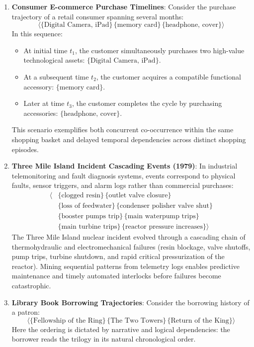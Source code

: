 \begin{enumerate}[label=\textbf{\arabic*.}]
    \item \textbf{Consumer E-commerce Purchase Timelines}:
    Consider the purchase trajectory of a retail consumer spanning several months:
    \begin{equation}
    \label{eq:seq-example-ecommerce-en}
    \langle \{\text{Digital Camera, iPad}\} \, \{\text{memory card}\} \, \{\text{headphone, cover}\} \rangle
    \end{equation}
    In this sequence:
    \begin{itemize}[noitemsep]
        \item At initial time $t_1$, the customer simultaneously purchases two high-value technological assets: $\{\text{Digital Camera, iPad}\}$.
        \item At a subsequent time $t_2$, the customer acquires a compatible functional accessory: $\{\text{memory card}\}$.
        \item Later at time $t_3$, the customer completes the cycle by purchasing accessories: $\{\text{headphone, cover}\}$.
    \end{itemize}
    This scenario exemplifies both concurrent co-occurrence within the same shopping basket and delayed temporal dependencies across distinct shopping episodes.

    \item \textbf{Three Mile Island Incident Cascading Events (1979)}:
    In industrial telemonitoring and fault diagnosis systems, events correspond to physical faults, sensor triggers, and alarm logs rather than commercial purchases:
    \begin{align}
    \label{eq:seq-example-tmi-en}
    \langle &\{\text{clogged resin}\} \, \{\text{outlet valve closure}\} \nonumber \\
    &\{\text{loss of feedwater}\} \, \{\text{condenser polisher valve shut}\} \nonumber \\
    &\{\text{booster pumps trip}\} \, \{\text{main waterpump trips}\} \nonumber \\
    &\{\text{main turbine trips}\} \, \{\text{reactor pressure increases}\} \rangle
    \end{align}
    The Three Mile Island nuclear incident evolved through a cascading chain of thermohydraulic and electromechanical failures (resin blockage, valve shutoffs, pump trips, turbine shutdown, and rapid critical pressurization of the reactor). Mining sequential patterns from telemetry logs enables predictive maintenance and timely automated interlocks before failures become catastrophic.

    \item \textbf{Library Book Borrowing Trajectories}:
    Consider the borrowing history of a patron:
    \begin{equation}
    \label{eq:seq-example-library-en}
    \langle \{\text{Fellowship of the Ring}\} \, \{\text{The Two Towers}\} \, \{\text{Return of the King}\} \rangle
    \end{equation}
    Here the ordering is dictated by narrative and logical dependencies: the borrower reads the trilogy in its natural chronological order.
\end{enumerate}

